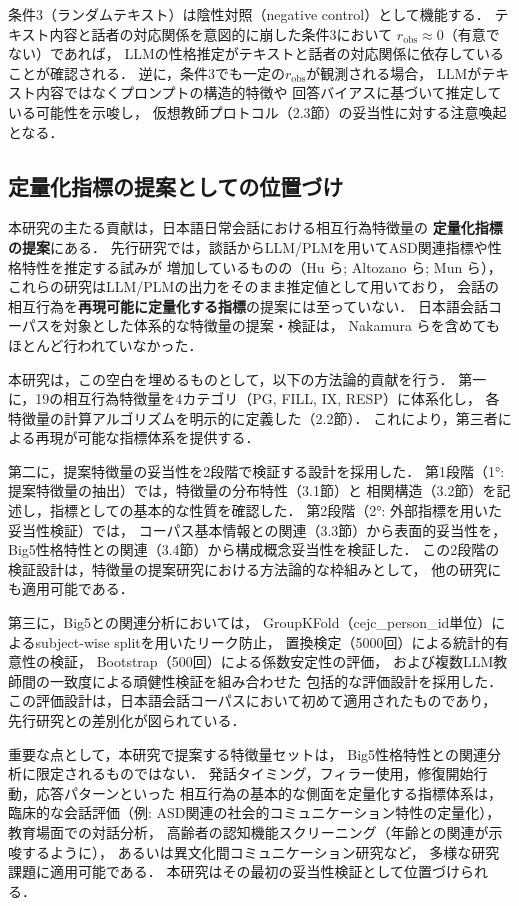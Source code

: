 \documentclass[dvipdfmx,11pt,a4paper]{bxjsarticle}
\begin{document}
条件3（ランダムテキスト）は陰性対照（negative control）として機能する．
テキスト内容と話者の対応関係を意図的に崩した条件3において
$r_{\text{obs}} \approx 0$（有意でない）であれば，
LLMの性格推定がテキストと話者の対応関係に依存していることが確認される．
逆に，条件3でも一定の$r_{\text{obs}}$が観測される場合，
LLMがテキスト内容ではなくプロンプトの構造的特徴や
回答バイアスに基づいて推定している可能性を示唆し，
仮想教師プロトコル（2.3節）の妥当性に対する注意喚起となる．

\subsection{定量化指標の提案としての位置づけ}

本研究の主たる貢献は，日本語日常会話における相互行為特徴量の
\textbf{定量化指標の提案}にある．
先行研究では，談話からLLM/PLMを用いてASD関連指標や性格特性を推定する試みが
増加しているものの（Hu ら\cite{hu2025}; Altozano ら\cite{altozano2026};
Mun ら\cite{mun2024}），これらの研究はLLM/PLMの出力をそのまま推定値として用いており，
会話の相互行為を\textbf{再現可能に定量化する指標}の提案には至っていない．
日本語会話コーパスを対象とした体系的な特徴量の提案・検証は，
Nakamura ら\cite{nakamura2025}を含めてもほとんど行われていなかった．

本研究は，この空白を埋めるものとして，以下の方法論的貢献を行う．
第一に，19の相互行為特徴量を4カテゴリ（PG, FILL, IX, RESP）に体系化し，
各特徴量の計算アルゴリズムを明示的に定義した（2.2節）．
これにより，第三者による再現が可能な指標体系を提供する．

第二に，提案特徴量の妥当性を2段階で検証する設計を採用した．
第1段階（1°: 提案特徴量の抽出）では，特徴量の分布特性（3.1節）と
相関構造（3.2節）を記述し，指標としての基本的な性質を確認した．
第2段階（2°: 外部指標を用いた妥当性検証）では，
コーパス基本情報との関連（3.3節）から表面的妥当性を，
Big5性格特性との関連（3.4節）から構成概念妥当性を検証した．
この2段階の検証設計は，特徴量の提案研究における方法論的な枠組みとして，
他の研究にも適用可能である．

第三に，Big5との関連分析においては，
GroupKFold（cejc\_person\_id単位）によるsubject-wise splitを用いたリーク防止，
置換検定（5000回）による統計的有意性の検証，
Bootstrap（500回）による係数安定性の評価，
および複数LLM教師間の一致度による頑健性検証を組み合わせた
包括的な評価設計を採用した．
この評価設計は，日本語会話コーパスにおいて初めて適用されたものであり，
先行研究との差別化が図られている．

重要な点として，本研究で提案する特徴量セットは，
Big5性格特性との関連分析に限定されるものではない．
発話タイミング，フィラー使用，修復開始行動，応答パターンといった
相互行為の基本的な側面を定量化する指標体系は，
臨床的な会話評価（例: ASD関連の社会的コミュニケーション特性の定量化），
教育場面での対話分析，
高齢者の認知機能スクリーニング（年齢との関連が示唆するように），
あるいは異文化間コミュニケーション研究など，
多様な研究課題に適用可能である．
本研究はその最初の妥当性検証として位置づけられる．
\end{document}
